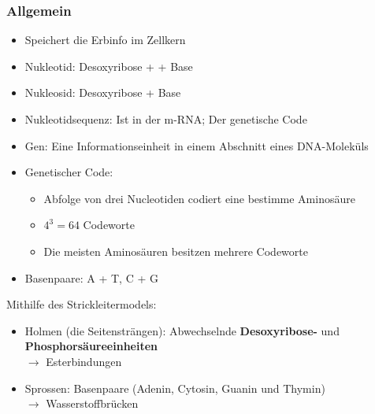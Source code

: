 \documentclass[a4paper, 12pt]{scrartcl}
\begin{document}
\subsubsection{Allgemein}
\begin{itemize}
    \item Speichert die Erbinfo im Zellkern
    \item Nukleotid: Desoxyribose +  + Base
    \item Nukleosid: Desoxyribose + Base
    \item Nukleotidsequenz: Ist in der m-RNA; Der genetische Code
    \item Gen: Eine Informationseinheit in einem Abschnitt eines DNA-Moleküls
    \item Genetischer Code:
        \begin{itemize}
            \item Abfolge von drei Nucleotiden codiert eine bestimme Aminosäure
            \item $4^{3} = 64$ Codeworte
            \item Die meisten Aminosäuren besitzen mehrere Codeworte
        \end{itemize}
    \item Basenpaare: A + T, C + G
\end{itemize}
%
Mithilfe des Strickleitermodels:
\begin{itemize}
    \item Holmen (die Seitensträngen): Abwechselnde \textbf{Desoxyribose-} und
        \textbf{Phosphorsäureeinheiten} \\
        $ \rightarrow$ Esterbindungen
    \item Sprossen: Basenpaare (Adenin, Cytosin, Guanin und Thymin) \\
        $ \rightarrow$ Wasserstoffbrücken
\end{itemize}
\end{document}
